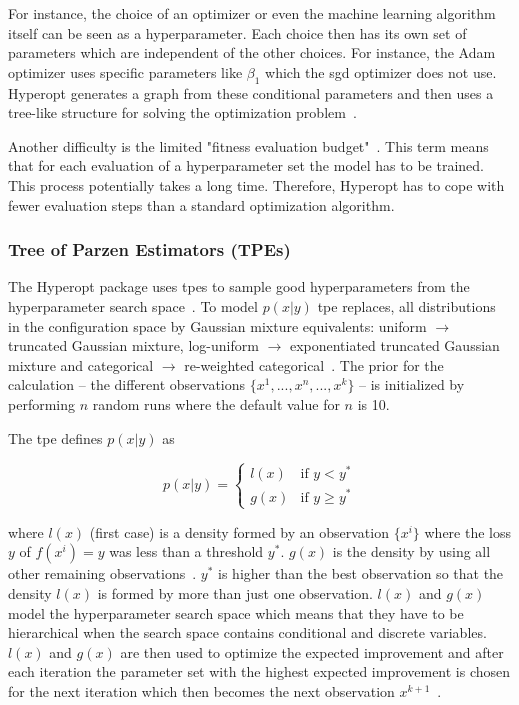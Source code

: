 For instance, the choice of an optimizer or even the machine learning algorithm itself can be seen as a hyperparameter. Each choice then has its own set of parameters which are independent of the other choices. For instance, the Adam optimizer uses specific parameters like $\beta_1$ which the \gls{sgd} optimizer does not use. Hyperopt generates a graph from these conditional parameters and then uses a tree-like structure for solving the optimization problem~\cite{Bergstra2011}.
\newline

Another difficulty is the limited "fitness evaluation budget"~\cite{Bergstra2011}. This term means that for each evaluation of a hyperparameter set the model has to be trained. This process potentially takes a long time. Therefore, Hyperopt has to cope with fewer evaluation steps than a standard optimization algorithm.

\subsubsection*{Tree of Parzen Estimators {(TPEs)}}
The Hyperopt package uses \glspl{tpe} to sample good hyperparameters from the hyperparameter search space~\cite{Bergstra2013a}. To model $p(x|y)$ \gls{tpe} replaces, all distributions in the configuration space by Gaussian mixture equivalents: uniform $\rightarrow$ truncated Gaussian mixture, log-uniform $\rightarrow$ exponentiated truncated Gaussian mixture and categorical $\rightarrow$ re-weighted categorical~\cite{Bergstra2013a}. The prior for the calculation -- the different observations $\{x^1,..., x^n, ..., x^k\}$ -- is initialized by performing $n$ random runs where the default value for $n$ is 10.

The \gls{tpe} defines $p(x|y)$ as 

\begin{equation}
p(x|y) =
\begin{cases}

l(x) & \text{if } y < y^* \\
g(x) & \text{if } y \geq y^*

\end{cases}
\end{equation}

where $l(x)$ {(first case)} is a density formed by an observation $\{x^i\}$ where the loss $y$ of $f(x^i)=y$ was less than a threshold $y^*$. $g(x)$ is the density by using all other remaining observations~\cite{Bergstra2013a}. $y^*$ is higher than the best observation so that the density $l(x)$ is formed by more than just one observation. $l(x)$ and $g(x)$ model the hyperparameter search space which means that they have to be hierarchical when the search space contains conditional and discrete variables. $l(x)$ and $g(x)$ are then used to optimize the expected improvement and after each iteration the parameter set with the highest expected improvement is chosen for the next iteration which then becomes the next observation $x^{k+1}$~\cite{Bergstra2013a}. 

